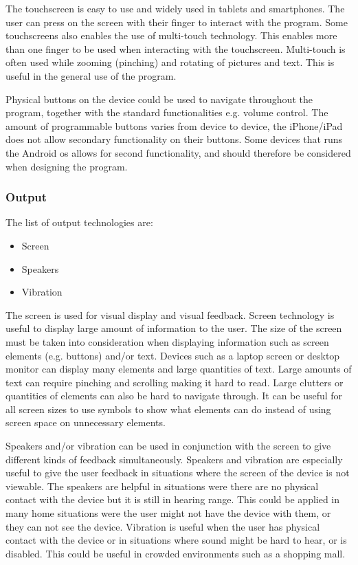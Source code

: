 The touchscreen is easy to use and widely used in tablets and smartphones. The user can press on the screen with their finger to interact with the program. Some touchscreens also enables the use of multi-touch technology. This enables more than one finger to be used when interacting with the touchscreen. Multi-touch is often used while zooming (pinching) and rotating of pictures and text. This is useful in the general use of the program.
%

Physical buttons on the device could be used to navigate throughout the program, together with the standard functionalities e.g. volume control. The amount of programmable buttons varies from device to device, the iPhone/iPad does not allow secondary functionality on their buttons. Some devices that runs the Android os allows for second functionality\cite{android_Rebind}, and should therefore be considered when designing the program.

\subsubsection{Output}
The list of output technologies are:

\begin{itemize}
    \item Screen
    \item Speakers
    \item Vibration
\end{itemize}

The screen is used for visual display and visual feedback. Screen technology is useful to display large amount of information to the user.
The size of the screen must be taken into consideration when displaying information such as screen elements (e.g. buttons) and/or text.
Devices such as a laptop screen or desktop monitor can display many elements and large quantities of text.
Large amounts of text can require pinching and scrolling making it hard to read. Large clutters or quantities of elements can also be hard to navigate through.
It can be useful for all screen sizes to use symbols to show what elements can do instead of using screen space on unnecessary elements.

Speakers and/or vibration can be used in conjunction with the screen to give different kinds of feedback simultaneously.
Speakers and vibration are especially useful to give the user feedback in situations where the screen of the device is not viewable.
The speakers are helpful in situations were there are no physical contact with the device but it is still in hearing range.
This could be applied in many home situations were the user might not have the device with them, or they can not see the device.
Vibration is useful when the user has physical contact with the device or in situations where sound might be hard to hear, or is disabled.
This could be useful in crowded environments such as a shopping mall.     

